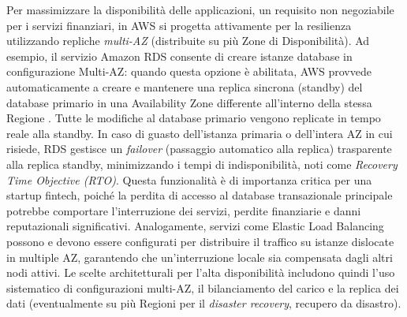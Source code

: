 Per massimizzare la disponibilità delle applicazioni, un requisito non negoziabile per i servizi finanziari, in AWS si progetta attivamente per la resilienza utilizzando repliche \textit{multi-AZ} (distribuite su più Zone di Disponibilità). Ad esempio, il servizio Amazon RDS consente di creare istanze database in configurazione Multi-AZ: quando questa opzione è abilitata, AWS provvede automaticamente a creare e mantenere una replica sincrona (standby) del database primario in una Availability Zone differente all'interno della stessa Regione \cite{aws-rds-multiaz}. Tutte le modifiche al database primario vengono replicate in tempo reale alla standby. In caso di guasto dell'istanza primaria o dell'intera AZ in cui risiede, RDS gestisce un \textit{failover} (passaggio automatico alla replica) trasparente alla replica standby, minimizzando i tempi di indisponibilità, noti come \textit{Recovery Time Objective (RTO)}. Questa funzionalità è di importanza critica per una startup fintech, poiché la perdita di accesso al database transazionale principale potrebbe comportare l'interruzione dei servizi, perdite finanziarie e danni reputazionali significativi. Analogamente, servizi come Elastic Load Balancing possono e devono essere configurati per distribuire il traffico su istanze dislocate in multiple AZ, garantendo che un'interruzione locale sia compensata dagli altri nodi attivi. Le scelte architetturali per l'alta disponibilità includono quindi l'uso sistematico di configurazioni multi-AZ, il bilanciamento del carico e la replica dei dati (eventualmente su più Regioni per il \textit{disaster recovery}, recupero da disastro).

